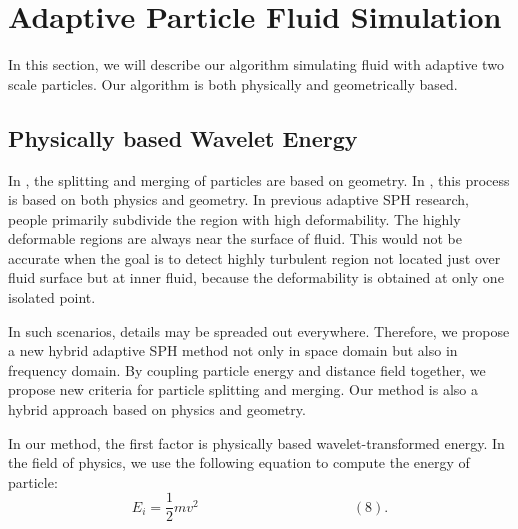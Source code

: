 \section{Adaptive Particle Fluid Simulation}

In this section, we will describe our algorithm simulating fluid with
adaptive two scale particles. Our algorithm is both physically and
geometrically based.

\subsection{Physically based Wavelet Energy}

In \cite{Adams:2007:ASP:1276377.1276437}, the splitting and merging of
particles are based on geometry. In
\cite{Hong:2008:API:1394332.1394340}, this process is based on both
physics and geometry. In previous adaptive SPH research, people
primarily subdivide the region with high deformability. The highly
deformable regions are always near the surface of fluid. This would
not be accurate when the goal is to detect highly turbulent region not
located just over fluid surface but at inner fluid, because the
deformability is obtained at only one isolated point.

In such scenarios, details may be spreaded out everywhere. Therefore,
we propose a new hybrid adaptive SPH method not only in space domain
but also in frequency domain.  By coupling particle energy and
distance field together, we propose new criteria for particle
splitting and merging. Our method is also a hybrid approach based on
physics and geometry.

In our method, the first factor is physically based
wavelet-transformed energy. In the field of physics, we use the
following equation to compute the energy of particle:
$$E_i=\frac{1}{2}mv^2 \quad \quad \quad \quad \quad \quad \quad \quad
\quad \quad \quad(8).$$

